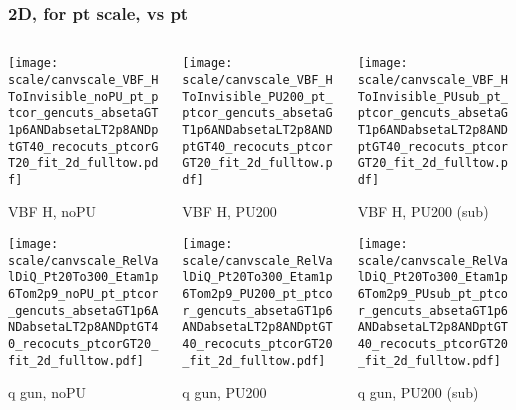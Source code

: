 \documentclass[8pt]{beamer}
\begin{document}
 \begin{frame}
  \frametitle{2D, for pt scale, vs pt}
  
  \begin{columns}
   \begin{column}{0.35\textwidth}
     \texttt{[image: scale/canvscale\_VBF\_HToInvisible\_noPU\_pt\_ptcor\_gencuts\_absetaGT1p6ANDabsetaLT2p8ANDptGT40\_recocuts\_ptcorGT20\_fit\_2d\_fulltow.pdf]}
     
     VBF H, noPU
    
     \texttt{[image: scale/canvscale\_RelValDiQ\_Pt20To300\_Etam1p6Tom2p9\_noPU\_pt\_ptcor\_gencuts\_absetaGT1p6ANDabsetaLT2p8ANDptGT40\_recocuts\_ptcorGT20\_fit\_2d\_fulltow.pdf]}
     
     q gun, noPU
   \end{column}
   \begin{column}{0.35\textwidth}
     \texttt{[image: scale/canvscale\_VBF\_HToInvisible\_PU200\_pt\_ptcor\_gencuts\_absetaGT1p6ANDabsetaLT2p8ANDptGT40\_recocuts\_ptcorGT20\_fit\_2d\_fulltow.pdf]}
     
     VBF H, PU200
    
     \texttt{[image: scale/canvscale\_RelValDiQ\_Pt20To300\_Etam1p6Tom2p9\_PU200\_pt\_ptcor\_gencuts\_absetaGT1p6ANDabsetaLT2p8ANDptGT40\_recocuts\_ptcorGT20\_fit\_2d\_fulltow.pdf]}
     
     q gun, PU200
   \end{column}
   \begin{column}{0.35\textwidth}
     \texttt{[image: scale/canvscale\_VBF\_HToInvisible\_PUsub\_pt\_ptcor\_gencuts\_absetaGT1p6ANDabsetaLT2p8ANDptGT40\_recocuts\_ptcorGT20\_fit\_2d\_fulltow.pdf]}
     
     VBF H, PU200 (sub)
    
     \texttt{[image: scale/canvscale\_RelValDiQ\_Pt20To300\_Etam1p6Tom2p9\_PUsub\_pt\_ptcor\_gencuts\_absetaGT1p6ANDabsetaLT2p8ANDptGT40\_recocuts\_ptcorGT20\_fit\_2d\_fulltow.pdf]}
     
     q gun, PU200 (sub)
   \end{column}
  \end{columns}
 \end{frame}
\end{document}
